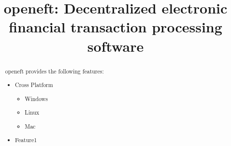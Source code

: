 \documentclass{article}
\begin{document}
\title{openeft: Decentralized electronic financial transaction processing software}

\maketitle

\begin{abstract}
\noindent
openeft provides the following features:

\begin{itemize}
  \item Cross Platform
  \begin{itemize}
    \item Windows
    \item Linux
    \item Mac
  \end{itemize}
  \item Feature1
\end{itemize}

\end{abstract}

\setcounter{tocdepth}{2}
\tableofcontents

\newpage
\end{document}
